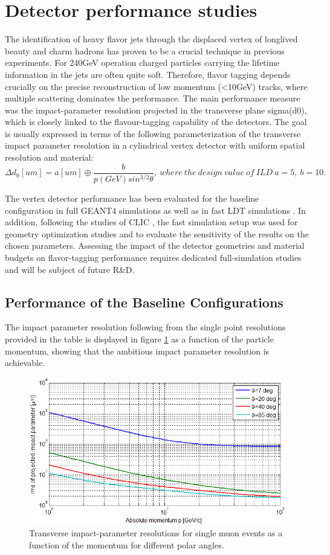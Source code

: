 \section{Detector performance studies}

The identification of heavy flavor jets through the displaced vertex of longlived beauty and charm hadrons has proven to be a crucial technique in previous experiments. For 240GeV operation charged particles carrying the lifetime information in the jets are often quite soft. Therefore, flavor tagging depends crucially on the precise reconstruction of low momentum (<10GeV) tracks, where multiple scattering dominates the performance. The main performance measure was the impact-parameter resolution projected in the transverse plane sigma(d0), which is closely linked to the flavour-tagging capability of the detectors. The goal is usually expressed in terms of the following parameterization of the transverse impact parameter resolution in a cylindrical vertex detector with uniform spatial resolution and material:
$$\Delta d_{0}[um]=a[um]\oplus\frac{b}{p(GeV)sin^{3/2}\theta},\ where\ the\ design\ value\ of\ ILD\ a = 5,\ b=10.$$


The vertex detector performance has been evaluated for the baseline configuration in full GEANT4 simulations as well as in fast LDT simulations \cite{xx2}. In addition, following the studies of CLIC \cite{dannheim2011layout}, the fast simulation setup was used for geometry optimization studies and to evaluate the sensitivity of the results on the chosen parameters. Assessing the impact of the detector geometries and material budgets on flavor-tagging performance requires dedicated full-simulation studies and will be subject of future R\&D.

\subsection{Performance of the Baseline Configurations}
The impact parameter resolution following from the single point resolutions provided in the table is displayed in figure \ref{fig:angle} as a function of the particle momentum, showing that the ambitious impact parameter resolution is achievable.
\begin{figure}[h!]
	\centering
	\includegraphics[scale=0.7]{Figures/Vertex/ipr_for_ang.png}
	\caption{Transverse impact-parameter resolutions for single muon events
		as a function of the momentum for different polar angles.}
	\label{fig:angle}
\end{figure}

